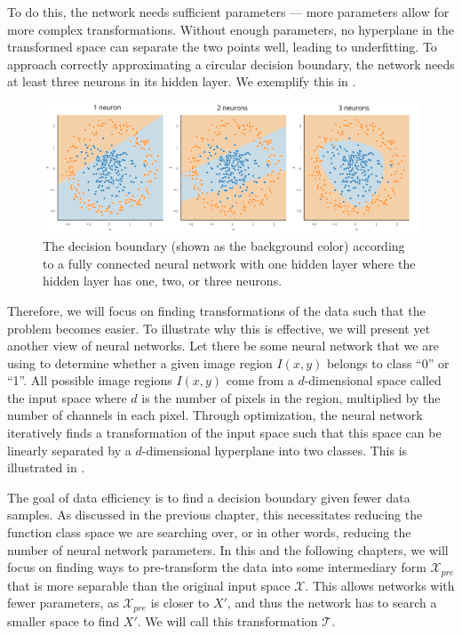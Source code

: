 To do this, the network needs sufficient parameters --- more parameters allow for more complex transformations. Without enough parameters, no hyperplane in the transformed space can separate the two points well, leading to underfitting. To approach correctly approximating a circular decision boundary, the network needs at least three neurons in its hidden layer. We exemplify this in .

	\begin{figure}[h]
		\centering
		\includegraphics[width=\linewidth]{images/4/circular_dataset_neurons}
		\caption{The decision boundary (shown as the background color) according to a fully connected neural network with one hidden layer where the hidden layer has one, two, or three neurons.}
		\label{fig:circ-datataset-neurons}
	\end{figure}

Therefore, we will focus on finding transformations of the data such that the problem becomes easier. To illustrate why this is effective, we will present yet another view of neural networks. Let there be some neural network that we are using to determine whether a given image region $I(x, y)$ belongs to class ``0'' or ``1''. All possible image regions $I(x, y)$ come from a $d$-dimensional space called the input space where $d$ is the number of pixels in the region, multiplied by the number of channels in each pixel. Through optimization, the neural network iteratively finds a transformation of the input space such that this space can be linearly separated by a $d$-dimensional hyperplane into two classes. This is illustrated in .

The goal of data efficiency is to find a decision boundary given fewer data samples. As discussed in the previous chapter, this necessitates reducing the function class space we are searching over, or in other words, reducing the number of neural network parameters. In this and the following chapters, we will focus on finding ways to pre-transform the data into some intermediary form $\mathcal{X}_{pre}$ that is more separable than the original input space $\mathcal{X}$. This allows networks with fewer parameters, as $\mathcal{X}_{pre}$ is closer to $X'$, and thus the network has to search a smaller space to find $X'$. We will call this transformation $\mathcal{T}$.

